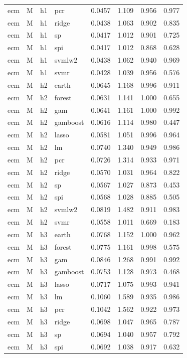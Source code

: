 \begin{ThreePartTable}
\begin{longtable}[t]{llclcccc}
ecm & M & h1 & pcr & 0.0457 & 1.109 & 0.956 & 0.977\\
ecm & M & h1 & ridge & 0.0438 & 1.063 & 0.902 & 0.835\\
ecm & M & h1 & sp & 0.0417 & 1.012 & 0.901 & 0.725\\
ecm & M & h1 & spi & 0.0417 & 1.012 & 0.868 & 0.628\\
ecm & M & h1 & svmlw2 & 0.0438 & 1.062 & 0.940 & 0.969\\
ecm & M & h1 & svmr & 0.0428 & 1.039 & 0.956 & 0.576\\
\addlinespace
ecm & M & h2 & earth & 0.0645 & 1.168 & 0.996 & 0.911\\
ecm & M & h2 & forest & 0.0631 & 1.141 & 1.000 & 0.655\\
ecm & M & h2 & gam & 0.0641 & 1.161 & 1.000 & 0.992\\
ecm & M & h2 & gamboost & 0.0616 & 1.114 & 0.980 & 0.447\\
ecm & M & h2 & lasso & 0.0581 & 1.051 & 0.996 & 0.964\\
ecm & M & h2 & lm & 0.0740 & 1.340 & 0.949 & 0.986\\
ecm & M & h2 & pcr & 0.0726 & 1.314 & 0.933 & 0.971\\
ecm & M & h2 & ridge & 0.0570 & 1.031 & 0.964 & 0.822\\
ecm & M & h2 & sp & 0.0567 & 1.027 & 0.873 & 0.453\\
ecm & M & h2 & spi & 0.0568 & 1.028 & 0.885 & 0.505\\
ecm & M & h2 & svmlw2 & 0.0819 & 1.482 & 0.911 & 0.983\\
ecm & M & h2 & svmr & 0.0558 & 1.011 & 0.669 & 0.183\\
\addlinespace
ecm & M & h3 & earth & 0.0768 & 1.152 & 1.000 & 0.962\\
ecm & M & h3 & forest & 0.0775 & 1.161 & 0.998 & 0.575\\
ecm & M & h3 & gam & 0.0846 & 1.268 & 0.991 & 0.992\\
ecm & M & h3 & gamboost & 0.0753 & 1.128 & 0.973 & 0.468\\
ecm & M & h3 & lasso & 0.0717 & 1.075 & 0.993 & 0.941\\
ecm & M & h3 & lm & 0.1060 & 1.589 & 0.935 & 0.986\\
ecm & M & h3 & pcr & 0.1042 & 1.562 & 0.922 & 0.973\\
ecm & M & h3 & ridge & 0.0698 & 1.047 & 0.965 & 0.787\\
ecm & M & h3 & sp & 0.0694 & 1.040 & 0.957 & 0.792\\
ecm & M & h3 & spi & 0.0692 & 1.038 & 0.917 & 0.632\\

\end{longtable}
\end{ThreePartTable}
